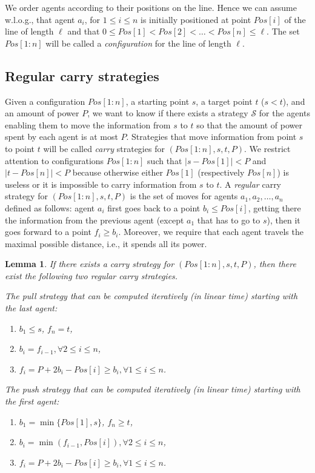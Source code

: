 \documentclass{article}
\newtheorem{lemma}{Lemma}
\newcommand\subproblem{carry\xspace}
\newcommand\cS{\ensuremath{\mathcal{S}\xspace}}
\begin{document}
We order agents according to their positions on the line. Hence we can assume w.l.o.g., that agent $a_i$, for $1 \leq i \leq n$ is initially positioned at point $Pos[i]$ of the line of length $\ell$ and that $0\leq Pos[1]< Pos[2] < \ldots < Pos[n]\leq\ell $. 
The set $Pos[1:n]$ will be called a \emph{configuration} for the line of length $\ell$.


\subsection{Regular {\subproblem} strategies}

Given a configuration $Pos[1:n]$, a starting point $s$, a
target point $t$ ($s < t$), and an amount of power $P$, we want to know if there
exists a strategy $\cS$ for the agents enabling them to move the
information from $s$ to $t$ so that the amount of power spent by
each agent is at most $P$. Strategies that move information from point $s$ to point $t$ will be called \emph{carry} strategies for $(Pos[1:n],s,t,P)$. We restrict attention to configurations $Pos[1:n]$ such that $|s -Pos[1]|<P$ and $|t-Pos[n]|<P$ because otherwise either $Pos[1]$ (respectively $Pos[n]$) is useless or it is impossible to carry information from $s$ to $t$. A \emph{regular} carry strategy for $(Pos[1:n],s,t,P)$ is the set of moves for agents $a_1,a_2,\dots, a_n$ defined as follows: agent $a_i$ first goes back to a point $b_i \leq Pos[i]$, getting there the information
from the previous agent (except $a_1$ that has to go to $s$), then it goes forward to a point $f_i \geq b_i$. Moreover, we require
that each agent travels the maximal possible
distance, i.e., it spends all its power.


\begin{lemma}\label{lem-subproblem}
If there exists a \subproblem strategy for  $(Pos[1:n],s,t,P)$, then there exist the following two regular \subproblem strategies. 

The pull strategy that can be computed iteratively (in linear time) starting with the
last agent:
\begin{enumerate}
\item $b_1 \leq s$, $f_n = t$,
\item $b_i = f_{i-1}, \forall 2 \leq i \leq n$,
\item $f_i = P + 2b_i - Pos[i] \geq b_i,  \forall 1 \leq i \leq n$.
\end{enumerate}

The push strategy that can be computed iteratively (in linear time)  starting with the
first agent:
\begin{enumerate}
\item $b_1 = \min\{Pos[1],s\}$, $f_n \geq t$,
\item $b_i = \min(f_{i-1},Pos[i]), \forall 2 \leq i \leq n$,
\item $f_i = P + 2b_i - Pos[i] \geq b_i,  \forall 1 \leq i \leq n$.
\end{enumerate}
\end{lemma}
\end{document}
